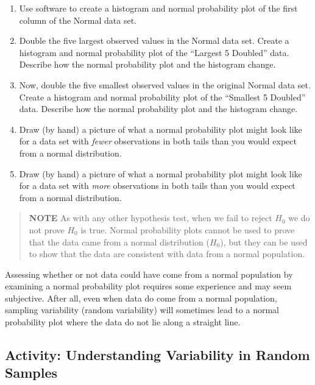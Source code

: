 \documentclass[
]{book}
\begin{document}
\begin{enumerate}
\def\labelenumi{\alph{enumi}.}
\item
  Use software to create a histogram and normal probability plot of the first column of the Normal data set.
\item
  Double the five largest observed values in the Normal data set. Create a histogram and normal probability plot of the ``Largest 5 Doubled'' data. Describe how the normal probability plot and the histogram change.
\item
  Now, double the five smallest observed values in the original Normal data set. Create a histogram and normal probability plot of the ``Smallest 5 Doubled'' data. Describe how the normal probability plot and the histogram change.
\item
  Draw (by hand) a picture of what a normal probability plot might look like for a data set with \emph{fewer} observations in both tails than you would expect from a normal distribution.
\item
  Draw (by hand) a picture of what a normal probability plot might look like for a data set with \emph{more} observations in both tails than you would expect from a normal distribution.
\end{enumerate}

\begin{quote}
\textbf{NOTE} As with any other hypothesis test, when we fail to reject \(H_0\) we do not prove \(H_0\) is true. Normal probability plots cannot be used to prove that the data came from a normal distribution (\(H_0\)), but they can be used to show that the data are consistent with data from a normal population.
\end{quote}

Assessing whether or not data could have come from a normal population by examining a normal probability plot requires some experience and may seem subjective. After all, even when data do come from a normal population, sampling variability (random variability) will sometimes lead to a normal probability plot where the data do not lie along a straight line.

\hypertarget{activity-understanding-variability-in-random-samples}{%
\subsection*{Activity: Understanding Variability in Random Samples}\label{activity-understanding-variability-in-random-samples}}
\end{document}
